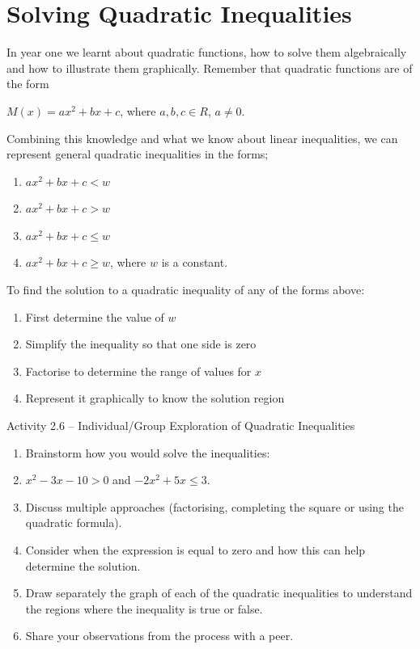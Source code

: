 \section{Solving Quadratic Inequalities}

In year one we learnt about quadratic functions, how to solve them algebraically
and how to illustrate them graphically. Remember that quadratic functions are of
the form

$M(x) = ax^2 + bx + c$, where $a, b, c \in R$, $a \ne 0$.

Combining this knowledge and what we know about linear inequalities, we can
represent general quadratic inequalities in the forms;
\begin{enumerate}
  \item $ax^2 + bx + c < w$
  \item $ax^2 + bx + c > w$
  \item $ax^2 + bx + c \le w$
  \item $ax^2 + bx + c \ge w$, where $w$ is a constant.
\end{enumerate}
To find the solution to a quadratic inequality of any of the forms above:
\begin{enumerate}
  \item First determine the value of $w$
  \item Simplify the inequality so that one side is zero
  \item Factorise to determine the range of values for $x$
  \item Represent it graphically to know the solution region
\end{enumerate}

\begin{activity}{Activity 2.6 -- Individual/Group Exploration of Quadratic Inequalities}
\begin{enumerate}
  \item Brainstorm how you would solve the inequalities:
  \item $x^2 - 3x - 10 > 0$ and $-2x^2 + 5x \le 3$.
  \item Discuss multiple approaches (factorising, completing the square or using
  the quadratic formula).
  \item Consider when the expression is equal to zero and how this can help
  determine the solution.
  \item Draw separately the graph of each of the quadratic inequalities to
  understand the regions where the inequality is true or false.
  \item Share your observations from the process with a peer.
\end{enumerate}
\end{activity}


